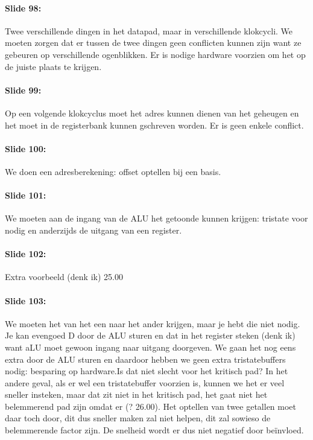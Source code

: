 \documentclass[10pt,a4paper]{book}
\begin{document}
\paragraph{Slide 98:} Twee verschillende dingen in het datapad, maar in verschillende klokcycli. We moeten zorgen dat er tussen de twee dingen geen conflicten kunnen zijn want ze gebeuren op verschillende ogenblikken. Er is nodige hardware voorzien om het op de juiste plaats te krijgen.

\paragraph{Slide 99:} Op een volgende klokcyclus moet het adres kunnen dienen van het geheugen en het moet in de registerbank kunnen gschreven worden.  Er is geen enkele conflict.

\paragraph{Slide 100:} We doen een adresberekening: offset optellen bij een basis.

\paragraph{Slide 101:} We moeten aan de ingang van de ALU het getoonde kunnen krijgen: tristate voor nodig en anderzijds de uitgang van een register.

\paragraph{Slide 102:} Extra voorbeeld (denk ik) 25.00

\paragraph{Slide 103:} We moeten het van het een naar het ander krijgen, maar je hebt die niet nodig. Je kan evengoed D door de ALU sturen en dat in het register steken (denk ik) want aLU moet gewoon ingang naar uitgang doorgeven. We gaan het nog eens extra door de ALU sturen en daardoor hebben we geen extra tristatebuffers nodig: besparing op hardware.Is dat niet slecht voor het kritisch pad? In het andere geval, als er wel een tristatebuffer voorzien is, kunnen we het er veel sneller insteken, maar dat zit niet in het kritisch pad, het gaat niet het belemmerend pad zijn omdat er (? 26.00). Het optellen van twee getallen moet daar toch door, dit dus sneller maken zal niet helpen, dit zal sowieso de belemmerende factor zijn. De snelheid wordt er dus niet negatief door be\"invloed.
\end{document}
